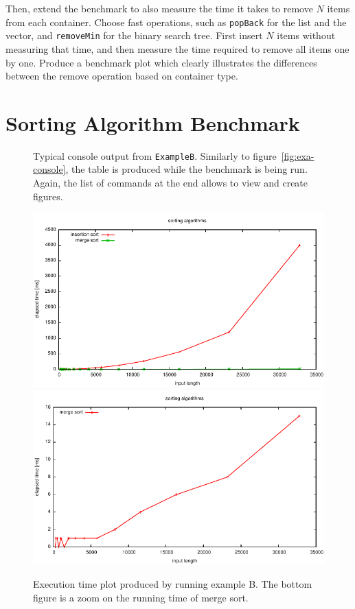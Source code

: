 \documentclass[a4paper,10pt]{article}
\begin{document}
Then, extend the benchmark to also measure the time it takes to remove $N$ items from each container.
Choose fast operations, such as \texttt{popBack} for the list and the vector, and \texttt{removeMin} for the binary search tree.
First insert $N$ items without measuring that time, and then measure the time required to remove all items one by one.
Produce a benchmark plot which clearly illustrates the differences between the remove operation based on container type.



\section{Sorting Algorithm Benchmark}

\begin{figure}
  \centering
  \caption{
    Typical console output from \texttt{ExampleB}.
    Similarly to figure~\ref{fig:exa-console}, the table is produced while the benchmark is being run.
    Again, the list of commands at the end allows to view and create figures.
  }\label{fig:exb-console}
\end{figure}

\begin{figure}
  \centering
  \includegraphics[width=0.8\columnwidth]{plot-ExampleB-all.pdf}\\
  \includegraphics[width=0.8\columnwidth]{plot-ExampleB-zoom.pdf}
  \caption{
    Execution time plot produced by running example B.
    The bottom figure is a zoom on the running time of merge sort.
  }\label{fig:exb-plot}
\end{figure}
\end{document}
